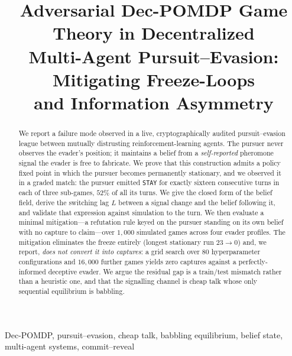 \documentclass[conference]{IEEEtran}
\begin{document}
\title{Adversarial Dec-POMDP Game Theory in Decentralized\\
Multi-Agent Pursuit--Evasion: Mitigating Freeze-Loops\\
and Information Asymmetry}

\author{
}

\maketitle

\begin{abstract}
We report a failure mode observed in a live, cryptographically audited
pursuit--evasion league between mutually distrusting reinforcement-learning
agents. The pursuer never observes the evader's position; it maintains a
belief from a \emph{self-reported} pheromone signal the evader is free to
fabricate. We prove that this construction admits a policy fixed point in
which the pursuer becomes permanently stationary, and we observed it in a
graded match: the pursuer emitted \texttt{STAY} for exactly sixteen
consecutive turns in each of three sub-games, $52\%$ of all its turns. We give
the closed form of the belief field, derive the switching lag $L$ between a
signal change and the belief following it, and validate that expression
against simulation to the turn. We then evaluate a minimal mitigation---a
refutation rule keyed on the pursuer standing on its own belief with no
capture to claim---over $1{,}000$ simulated games across four evader profiles.
The mitigation eliminates the freeze entirely (longest stationary run $23
\rightarrow 0$) and, we report, \emph{does not convert it into captures}: a
grid search over $80$ hyperparameter configurations and $16{,}000$ further
games yields zero captures against a perfectly-informed deceptive evader. We
argue the residual gap is a train/test mismatch rather than a heuristic one,
and that the signalling channel is cheap talk whose only sequential
equilibrium is babbling.
\end{abstract}

\begin{IEEEkeywords}
Dec-POMDP, pursuit--evasion, cheap talk, babbling equilibrium, belief state,
multi-agent systems, commit--reveal
\end{IEEEkeywords}
\end{document}
